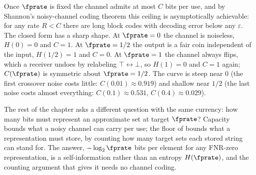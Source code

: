 Once $\fprate$ is fixed the channel admits at most $C$ bits per use, and by
Shannon's noisy-channel coding theorem this ceiling is asymptotically
achievable: for any rate $R < C$ there are long block codes with decoding
error below any $\varepsilon$. The closed form has a sharp shape. At $\fprate
= 0$ the channel is noiseless, $H(0) = 0$ and $C = 1$. At $\fprate = 1/2$ the
output is a fair coin independent of the input, $H(1/2) = 1$ and $C = 0$. At
$\fprate = 1$ the channel always flips, which a receiver undoes by relabeling
$\top \leftrightarrow \bot$, so $H(1) = 0$ and $C = 1$ again; $C(\fprate)$ is
symmetric about $\fprate = 1/2$. The curve is steep near $0$ (the first
crossover noise costs little: $C(0.01) \approx 0.919$) and shallow near $1/2$
(the last noise costs almost everything: $C(0.1) \approx 0.531$, $C(0.4)
\approx 0.029$).

The rest of the chapter asks a different question with the same currency:
how many bits must represent an approximate set at target $\fprate$? Capacity
bounds what a noisy channel can carry per use; the floor of
 bounds what a representation must store, by counting
how many target sets each stored string can stand for. The answer, $-\log_2
\fprate$ bits per element for any FNR-zero representation, is a
self-information rather than an entropy $H(\fprate)$, and the counting
argument that gives it needs no channel coding.
